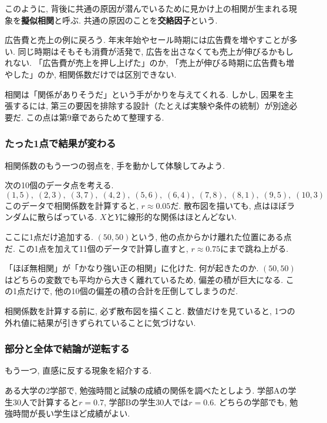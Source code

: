 このように, 背後に共通の原因が潜んでいるために見かけ上の相関が生まれる現象を\textbf{擬似相関}と呼ぶ.
共通の原因のことを\textbf{交絡因子}という.

広告費と売上の例に戻ろう.
年末年始やセール時期には広告費を増やすことが多い.
同じ時期はそもそも消費が活発で, 広告を出さなくても売上が伸びるかもしれない.
「広告費が売上を押し上げた」のか, 「売上が伸びる時期に広告費も増やした」のか, 相関係数だけでは区別できない.

相関は「関係がありそうだ」という手がかりを与えてくれる.
しかし, 因果を主張するには, 第三の要因を排除する設計（たとえば実験や条件の統制）が別途必要だ.
この点は第9章であらためて整理する.

\subsubsection*{たった1点で結果が変わる}

相関係数のもう一つの弱点を, 手を動かして体験してみよう.

次の10個のデータ点を考える.
\[
(1,5),\; (2,3),\; (3,7),\; (4,2),\; (5,6),\; (6,4),\; (7,8),\; (8,1),\; (9,5),\; (10,3)
\]
このデータで相関係数を計算すると, $r \approx 0.05$だ.
散布図を描いても, 点はほぼランダムに散らばっている.
$X$と$Y$に線形的な関係はほとんどない.

ここに1点だけ追加する.
$(50, 50)$という, 他の点からかけ離れた位置にある点だ.
この1点を加えて11個のデータで計算し直すと, $r \approx 0.75$にまで跳ね上がる.


「ほぼ無相関」が「かなり強い正の相関」に化けた.
何が起きたのか.
$(50, 50)$はどちらの変数でも平均から大きく離れているため, 偏差の積が巨大になる.
この1点だけで, 他の10個の偏差の積の合計を圧倒してしまうのだ.

相関係数を計算する前に, 必ず散布図を描くこと.
数値だけを見ていると, 1つの外れ値に結果が引きずられていることに気づけない.

\subsubsection*{部分と全体で結論が逆転する}

もう一つ, 直感に反する現象を紹介する.

ある大学の2学部で, 勉強時間と試験の成績の関係を調べたとしよう.
学部Aの学生30人で計算すると$r = 0.7$, 学部Bの学生30人では$r = 0.6$.
どちらの学部でも, 勉強時間が長い学生ほど成績がよい.

